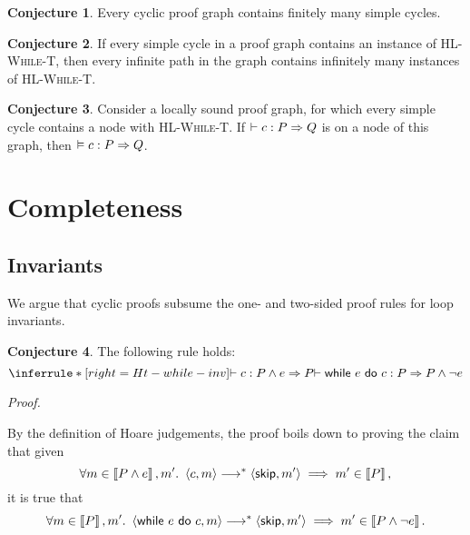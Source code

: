 \documentclass[10pt]{article}
\theoremstyle{definition}
\newtheorem{conjecture}{Conjecture}
\begin{document}
\begin{conjecture}
    Every cyclic proof graph contains finitely many simple cycles.
\end{conjecture}


\begin{conjecture}
    If every simple cycle in a proof graph
    contains an instance of \textsc{HL-While-T},
    then every infinite path in the graph
    contains infinitely many instances of \textsc{HL-While-T}.
\end{conjecture}

\begin{conjecture}
    Consider a locally sound proof graph,
    for which every simple cycle contains a node
    with \textsc{HL-While-T}.
    If $\DER \Triple c : P => Q$ is on a node of this graph,
    then $\VAL \Triple c : P => Q$.
\end{conjecture}



\section{Completeness}

\subsection*{Invariants}

We argue that cyclic proofs subsume the one- and two-sided proof rules for loop invariants.


\begin{conjecture}
The following rule holds:
\begin{displaymath}
    \inferrule*[right=Ht-while-inv]
    { \DER \Triple c : P \wedge e => P }
    { \DER \Triple \While e do c : P => P \wedge \neg e }
\end{displaymath}
\end{conjecture}

\noindent
\emph{Proof.}

\noindent
By the definition of Hoare judgements, the proof boils down to proving 
the claim that given 
\[
    \forall m \in \Interp{P \wedge e}, m'.\
    \Cfg(c, m) \sstepstotrans \Cfg(\Skip, m') 
    \implies m' \in \Interp{P},
\]
it is true that 
\[
    \forall m \in \Interp{P}, m'.\
    \Cfg(\While e do c, m) \sstepstotrans \Cfg(\Skip, m')
    \implies m' \in \Interp{P \wedge \neg e}.
\]
\end{document}
